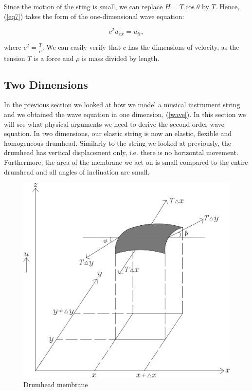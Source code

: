 \documentclass[a4paper, 12pt]{article}
\numberwithin{equation}{section}
\begin{document}
Since the motion of the sting is small, we can replace $H=T\cos{\theta}$ by $T$.\cite{BoyDiP} Hence, (\ref{eq7}) takes the 
form of the one-dimensional wave equation:

\begin{equation} \label{wave}
    c^2u_{xx}=u_{tt}, 
\end{equation}

where $c^2=\frac{T}{\rho}$. We can easily verify that $c$ has the dimensions of 
velocity, as the tension $T$ is a force and $\rho$ is mass divided by length.

\subsection{Two Dimensions} \label{twodim}
In the previous section we looked at how we model a musical instrument string and we obtained the wave equation in 
one dimension, (\ref{wave}). In this section we will see what physical arguments we need to derive the second order wave equation.
In two dimensions, our elastic string is now an elastic, flexible and homogeneous drumhead. Similarly to the string we looked at previously, 
the drumhead has vertical displacement only, i.e. there is no horizontal movement. Furthermore, the area of the membrane we act on is small
compared to the entire drumhead and all angles of inclination are small. \cite{Kr}

\begin{figure}[h]
    \centering
    \includegraphics[scale=0.5]{images/grafic-5} 
    \caption{Drumhead membrane}
    \label{fig:2}
\end{figure}
\end{document}
